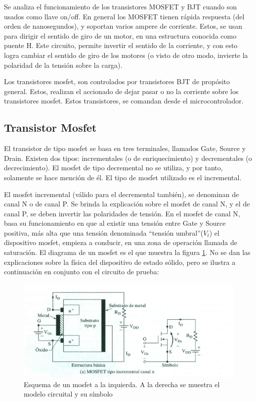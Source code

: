 Se analiza el funcionamiento de los transistores MOSFET y BJT cuando son usados como llave on/off. En general los MOSFET tienen rápida respuesta (del orden de nanosegundos), y soportan varios ampere de corriente. Estos, se usan para dirigir el sentido de giro de un motor, en una estructura conocida como puente H. Este circuito, permite invertir el sentido de la corriente, y con esto logra cambiar el sentido de giro de los motores (o visto de otro modo, invierte la polaridad de la tensión sobre la carga). 

Los transistores mosfet, son controlados por transistores BJT de propósito general. Estos, realizan el accionado de dejar pasar o no la corriente sobre los transistores mosfet. Estos transistores, se comandan desde el microcontrolador.
 
%
\subsection{Transistor Mosfet} 

El transistor de tipo mosfet se basa en tres terminales, llamados Gate, Source y Drain. Existen dos tipos: incrementales (o de enriquecimiento) y decrementales (o decrecimiento). El mosfet de tipo decremental no se utiliza, y por tanto, solamente se hace mención de él. El tipo de mosfet utilizado es el incremental. 

El mosfet incremental (válido para el decremental también), se denominan de canal N o de canal P. Se brinda la explicación sobre el mosfet de canal N, y el de canal P, se deben invertir las polaridades de tensión. En el mosfet de canal N, basa su funcionamiento en que al existir una tensión entre Gate y Source positiva, más alta que una tensión denominada ``tensión umbral''($V_{t}$) el dispositivo mosfet, empieza a conducir, en una zona de operación llamada de saturación. El diagrama de un mosfet es el que muestra la figura \ref{fig:mosfet_str_model}. No se dan las explicaciones sobre la física del dispositivo de estado sólido, pero se ilustra a continuación en conjunto con el circuito de prueba: 

\begin{figure}[ht!]
	\includegraphics{mosfet_estr}
	\caption{Esquema de un mosfet a la izquierda. A la derecha se muestra el modelo circuital y su símbolo}
	\label{fig:mosfet_str_model}
\end{figure}

